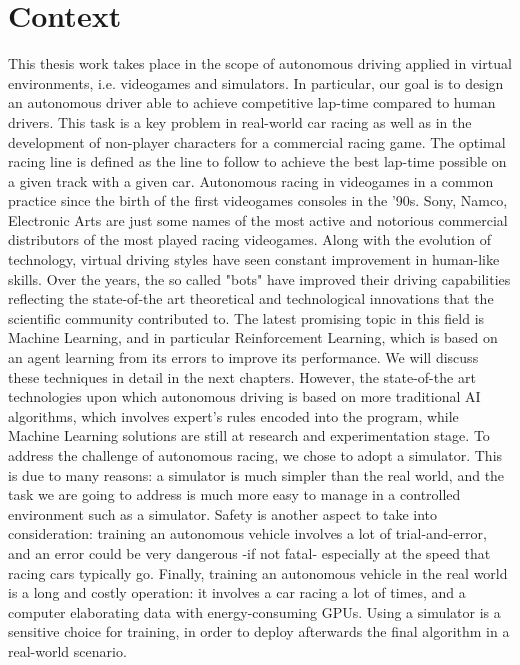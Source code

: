 \chapter{Context}
\label{Context}
\thispagestyle{empty}


This thesis work takes place in the scope of autonomous driving applied in virtual environments, i.e. videogames and simulators. In particular, our goal is to design an autonomous driver able to achieve competitive lap-time compared to human drivers. This task is a key problem in real-world car racing as well as in the development of non-player characters for a commercial racing game. The optimal racing line is defined as the line to follow to achieve the best lap-time possible on a given track with a given car.
Autonomous racing in videogames in a common practice since the birth of the first videogames consoles in the '90s. Sony, Namco, Electronic Arts are just some names of the most active and notorious commercial distributors of the most played racing videogames. Along with the evolution of technology, virtual driving styles have seen constant improvement in human-like skills. Over the years, the so called "bots" have improved their driving capabilities reflecting the state-of-the art theoretical and technological innovations that the scientific community contributed to.
The latest promising topic in this field is Machine Learning, and in particular Reinforcement Learning, which is based on an agent learning from its errors to improve its performance. We will discuss these techniques in detail in the next chapters. However, the state-of-the art technologies upon which autonomous driving is based on more traditional AI algorithms, which involves expert's rules encoded into the program, while Machine Learning solutions are still at research and experimentation stage.
To address the challenge of autonomous racing, we chose to adopt a simulator. 
This is due to many reasons: a simulator is much simpler than the real world, and the task we are going to address is much more easy to manage in a controlled environment such as a simulator.
Safety is another aspect to take into consideration: training an autonomous vehicle involves a lot of trial-and-error, and an error could be very dangerous -if not fatal- especially at the speed that racing cars typically go.
Finally, training an autonomous vehicle in the real world is a long and costly operation: it involves a car racing a lot of times, and a computer elaborating data with energy-consuming GPUs.
Using a simulator is a sensitive choice for training, in order to deploy afterwards the final algorithm in a real-world scenario. 
